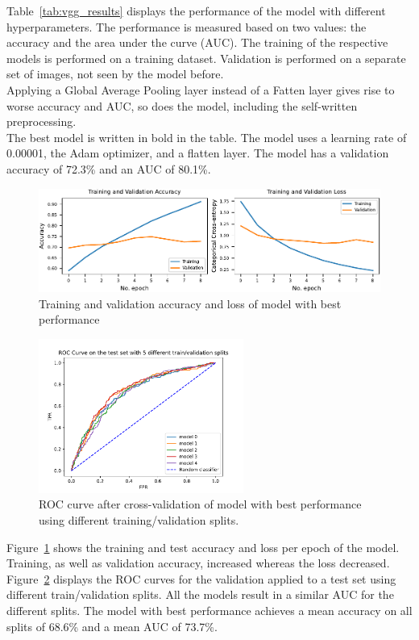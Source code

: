 \documentclass[sn-mathphys,Numbered]{sn-jnl}%
\theoremstyle{thmstyleone}%
\theoremstyle{thmstyletwo}%
\theoremstyle{thmstylethree}%
\begin{document}
Table~\ref{tab:vgg_results} displays the performance of the model with different hyperparameters. The performance is measured based on two values: the accuracy and the area under the curve (AUC). The training of the respective models is performed on a training dataset. Validation is performed on a separate set of images, not seen by the model before.\\
Applying a Global Average Pooling layer instead of a Fatten layer gives rise to worse accuracy and AUC, so does the model, including the self-written preprocessing.\\
The best model is written in bold in the table. The model uses a learning rate of 0.00001, the Adam optimizer, and a flatten layer. The model has a validation accuracy of 72.3\% and an AUC of 80.1\%.\\
\begin{figure}[ht]%
\centering
\includegraphics[width=1.0\textwidth]{VGG16_BaseModel-Adam_results_0.00001.pdf}
\caption{Training and validation accuracy and loss of model with best performance }\label{VGG-16_best}
\end{figure}
\begin{figure}[ht]%
\centering
\includegraphics[width=0.6\textwidth]{final_roc.pdf}
\caption{ROC curve after cross-validation of model with best performance using different training/validation splits.}\label{final-roc}
\end{figure}
Figure~\ref{VGG-16_best} shows the training and test accuracy and loss per epoch of the model. Training, as well as validation accuracy, increased whereas the loss decreased. Figure~\ref{final-roc} displays the ROC curves for the validation applied to a test set using different train/validation splits. All the models result in a similar AUC for the different splits. The model with best performance achieves a mean accuracy on all splits of 68.6\% and a mean AUC of 73.7\%.
\end{document}
